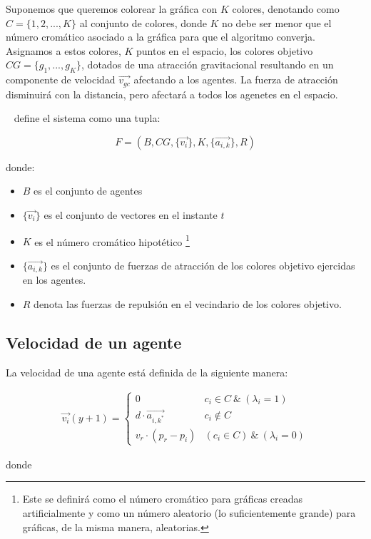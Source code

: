 \documentclass[a4paper]{report}
\begin{document}
Suponemos que queremos colorear la gr\'afica con $K$ colores, denotando
como $C = \{1, 2, ..., K\}$ al conjunto de colores, donde $K$ no debe ser menor
que el n\'umero crom\'atico asociado a la gr\'afica para que el algoritmo
converja. Asignamos a estos colores, $K$ puntos en el espacio, los colores
objetivo $CG = \{g_1, ..., g_K\}$, dotados de una atracci\'on gravitacional
resultando en un componente de velocidad $\vec{v_{gc}}$ afectando a los agentes.
La fuerza de atracci\'on disminuir\'a con la distancia, pero afectar\'a a todos
los agenetes en el espacio.

~\cite{israel} define el sistema como una tupla:

\[F = (B, CG, \{\vec{v_i}\}, K, \{\vec{a_{i, k}}\}, R)\]

donde:

\begin{itemize}
\item $B$ es el conjunto de agentes
\item $\{\vec{v_i}\}$ es el conjunto de vectores en el instante $t$
\item $K$ es el n\'umero crom\'atico hipot\'etico \footnote{Este se definir\'a
    como el n\'umero crom\'atico para gr\'aficas creadas artificialmente y
    como un n\'umero aleatorio (lo suficientemente grande) para gr\'aficas, de la
    misma manera, aleatorias.}
\item $\{\vec{a_{i, k}}\}$ es el conjunto de fuerzas de atracci\'on de los colores
  objetivo ejercidas en los agentes.
\item $R$ denota las fuerzas de repulsi\'on en el vecindario de los colores objetivo.
\end{itemize}

\subsection{Velocidad de un agente}
La velocidad de una agente est\'a definida de la siguiente manera:

\begin{align*}
  \vec{v_i}(y+1) =
  \begin{cases}
    0 & c_i \in C \ \& \ (\lambda_i = 1)\\
    d \cdot \vec{a_{i, k^*}} & c_i \not \in C\\
    v_r \cdot (p_r - p_i) & (c_i \in C) \ \& \ (\lambda_i = 0)
  \end{cases}
\end{align*}

donde
\end{document}
